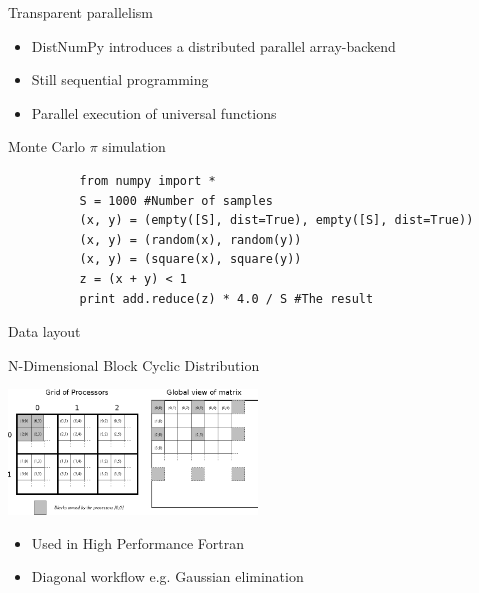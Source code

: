 \documentclass{beamer}
\begin{document}
\begin{frame}[fragile]{Transparent parallelism}
\begin{itemize}
  \item DistNumPy introduces a distributed parallel array-backend
  \item Still sequential programming
  \item Parallel execution of universal functions
\end{itemize}
\vspace{15px}
\begin{center}
\begin{small}
Monte Carlo $\pi$ simulation
\end{small}
\begin{scriptsize}
\begin{verbatim}
          from numpy import *
          S = 1000 #Number of samples
          (x, y) = (empty([S], dist=True), empty([S], dist=True))
          (x, y) = (random(x), random(y))
          (x, y) = (square(x), square(y))
          z = (x + y) < 1
          print add.reduce(z) * 4.0 / S #The result
\end{verbatim}
\end{scriptsize}
\end{center}
\end{frame}





\begin{frame}{Data layout}
\begin{center}
N-Dimensional Block Cyclic Distribution\vspace{15px}

\includegraphics[width=250px]{../gfx/datalayout}
\end{center}
\begin{itemize}
  \item Used in High Performance Fortran
  \item Diagonal workflow e.g. Gaussian elimination
\end{itemize}
\end{frame}
\end{document}
